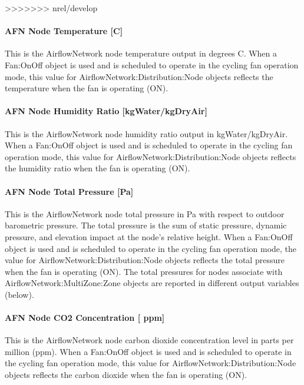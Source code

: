>>>>>>> nrel/develop
\paragraph{AFN Node Temperature {[}C{]}}\label{afn-node-temperature-c}

This is the AirflowNetwork node temperature output in degrees C. When a Fan:OnOff object is used and is scheduled to operate in the cycling fan operation mode, this value for AirflowNetwork:Distribution:Node objects reflects the temperature when the fan is operating (ON).

\paragraph{AFN Node Humidity Ratio {[}kgWater/kgDryAir{]}}\label{afn-node-humidity-ratio-kgwaterkgdryair}

This is the AirflowNetwork node humidity ratio output in kgWater/kgDryAir. When a Fan:OnOff object is used and is scheduled to operate in the cycling fan operation mode, this value for AirflowNetwork:Distribution:Node objects reflects the humidity ratio when the fan is operating (ON).

\paragraph{AFN Node Total Pressure {[}Pa{]}}\label{afn-node-total-pressure-pa}

This is the AirflowNetwork node total pressure in Pa with respect to outdoor barometric pressure. The total pressure is the sum of static pressure, dynamic pressure, and elevation impact at the node's relative height. When a Fan:OnOff object is used and is scheduled to operate in the cycling fan operation mode, the value for AirflowNetwork:Distribution:Node objects reflects the total pressure when the fan is operating (ON). The total pressures for nodes associate with AirflowNetwork:MultiZone:Zone objects are reported in different output variables (below).

\paragraph{AFN Node CO2 Concentration {[} ppm{]}}\label{afn-node-co2-concentration-ppm}

This is the AirflowNetwork node carbon dioxide concentration level in parts per million (ppm). When a Fan:OnOff object is used and is scheduled to operate in the cycling fan operation mode, this value for AirflowNetwork:Distribution:Node objects reflects the carbon dioxide when the fan is operating (ON).

